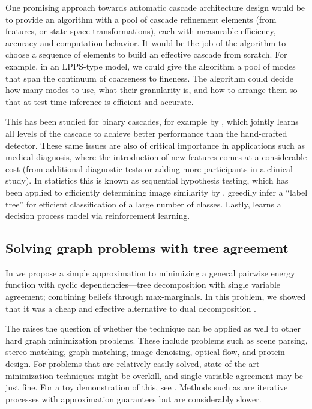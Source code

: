 One promising approach towards automatic cascade architecture design would be 
to provide an algorithm with a pool of cascade refinement elements (from 
features, or state space transformations), each with measurable efficiency, 
accuracy and computation behavior.  It would be the job of the algorithm to 
choose a sequence of elements to build an effective cascade from scratch.  For 
example, in an LPPS-type model, we could give the algorithm a pool of modes 
that span the continuum of coarseness to fineness.  The algorithm could decide 
how many modes to use, what their granularity is, and how to arrange them so 
that at test time inference is efficient and accurate.

This has been studied for binary cascades, for example by 
\citet{lefakis2010joint}, which jointly learns all levels of the cascade to 
achieve better performance than the hand-crafted \citet{viola02} detector.  
These same issues are also of critical importance in applications such as 
medical diagnosis, where the introduction of new features comes at a 
considerable cost (from additional diagnostic tests or adding more participants 
in a clinical study).  In statistics this is known as sequential hypothesis 
testing,  which has been applied to efficiently determining image similarity by 
\citet{ofir-pami}.  \citet{deng11} greedily infer a ``label tree'' for 
efficient classification of a large number of classes.  Lastly, \citet{vanroy} 
learns a decision process model via reinforcement learning.

\subsection{Solving graph problems with tree agreement}
In  we propose a simple approximation to minimizing a 
general pairwise energy function with cyclic dependencies---tree decomposition 
with single variable agreement; combining beliefs through max-marginals. In 
this problem, we showed that it was a cheap and effective alternative to dual 
decomposition \citep{komodakis2007}. 

The raises the question of whether the technique can be applied as well to 
other hard graph minimization problems.  These include problems such as scene 
parsing, stereo matching, graph matching, image denoising, optical flow, and 
protein design.  For problems that are relatively easily solved, 
state-of-the-art minimization techniques might be overkill, and single variable 
agreement may be just fine.  For a toy demonstration of this, see 
.  Methods such as 
\citet{jojic10,sontag-thesis,batra2011making} are iterative processes with 
approximation guarantees but are considerably slower. 


